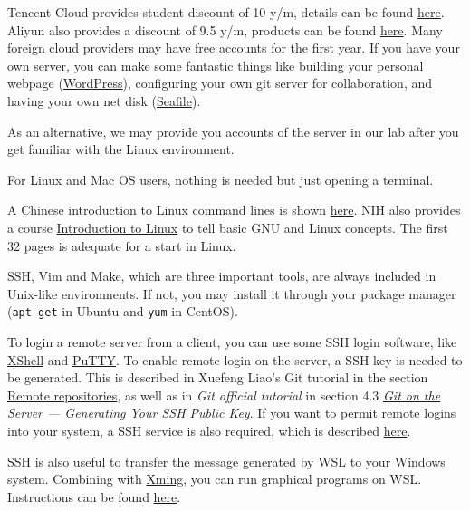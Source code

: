 \documentclass[english]{../TexTemplate/thesis}
\begin{document}
\begin{itemize}
	Tencent Cloud provides student discount of 10 y/m, details can be found \href{https://cloud.tencent.com/act/campus?from=11419}{here}.
	Aliyun also provides a discount of 9.5 y/m, products can be found \href{https://promotion.aliyun.com/ntms/act/campus2018.html?utm_content=se_1003165671}{here}.
	Many foreign cloud providers may have free accounts for the first year.
	If you have your own server, you can make some fantastic things like building your personal webpage (\href{https://wordpress.com/}{WordPress}), configuring your own git server for collaboration, and having your own net disk (\href{https://www.seafile.com/home/}{Seafile}).

	As an alternative, we may provide you accounts of the server in our lab after you get familiar with the Linux environment.
\end{itemize}

For Linux and Mac OS users, nothing is needed but just opening a terminal.

A Chinese introduction to Linux command lines is shown \href{https://linux.cn/article-6160-1.html}{here}. NIH also provides a course \href{https://hpc.nih.gov/training/handouts/Linux_NIH_2017.pdf}{Introduction to Linux} to tell basic GNU and Linux concepts. The first 32 pages is adequate for a start in Linux.

SSH, Vim and Make, which are three important tools, are always included in Unix-like environments. If not, you may install it through your package manager (\verb'apt-get' in Ubuntu and \verb'yum' in CentOS).

To login a remote server from a client, you can use some SSH login software, like \href{https://www.netsarang.com/en/xshell-download/}{XShell} and \href{https://www.putty.org/}{PuTTY}.
To enable remote login on the server, a SSH key is needed to be generated. This is described in Xuefeng Liao's Git tutorial in the section \href{https://www.liaoxuefeng.com/wiki/0013739516305929606dd18361248578c67b8067c8c017b000/001374385852170d9c7adf13c30429b9660d0eb689dd43a000}{Remote repositories}, as well as in \emph{Git official tutorial} in section 4.3 \href{https://git-scm.com/book/en/v2/Git-on-the-Server-Generating-Your-SSH-Public-Key}{\emph{Git on the Server --- Generating Your SSH Public Key}}. If you want to permit remote logins into your system, a SSH service is also required, which is described \href{http://www.linuxidc.com/Linux/2010-02/24349.htm}{here}.

SSH is also useful to transfer the message generated by WSL to your Windows system. Combining with \href{https://sourceforge.net/projects/xming/}{Xming}, you can run graphical programs on WSL. Instructions can be found \href{https://virtualizationreview.com/articles/2017/02/08/graphical-programs-on-windows-subsystem-on-linux.aspx}{here}.
\end{document}
